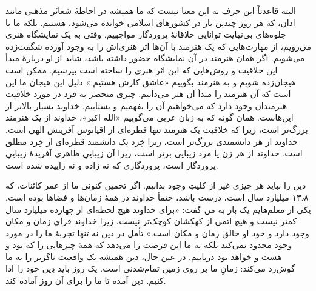 البته قاعدتاً این حرف به این معنا نیست که ما همیشه در احاطهٔ شعائر مذهبی مانند اذان، که هر روز چندین بار در کشورهای اسلامی خوانده می‌شود، هستیم. بلکه ما با جلوه‌های بی‌نهایت توانایی خلاقانهٔ پروردگار مواجهیم. وقتی به یک نمایشگاه هنری می‌رویم،‌ از مهارت‌هایی که یک هنرمند با آن‌ها اثر هنری‌اش را به وجود آورده شگفت‌زده می‌شویم. اگر همان هنرمند در آن نمایشگاه حضور داشته باشد، شاید از او دربارهٔ مبدأ این خلاقیت و روش‌هایی که این اثر هنری را ساخته است بپرسیم. ممکن است هیجان‌زده شویم و به هنرمند بگوییم «عاشق کارش هستیم.»  دلیل این هیجان ما این است که آن هنرمند را مبدأ آن هنر می‌دانیم. چیزی منحصر به فرد در مورد خلاقیت هنرمندان وجود دارد که می‌خواهیم آن را بفهمیم و بستاییم. خداوند بسیار بالاتر از این‌هاست. همان گونه که به زبان عربی می‌گوییم  «الله اکبر»، خداوند از یک هنرمند بزرگ‌تر است، زیرا که خلاقیت یک هنرمند تنها قطره‌ای از اقیانوس آفرینش الهی است. خداوند از هر دانشمندی بزرگ‌تر است، زیرا خِرد یک دانشمند قطره‌ای از خِرد مطلق است. خداوند از هر زن یا مرد زیبایی برتر است، زیرا آن زیباییِ ظاهری آفریدهٔ زیباییِ پروردگار است، پروردگاری که نه زاده و نه زاییده شده است. 

دین را نباید هر چیزی غیر از کلیتِ وجود بدانیم. اگر تخمین کنونی ما از عمر کائنات، که ۱۳٫۸ میلیارد سال است، درست باشد، حتماً خداوند در همهٔ زمان‌ها و فضاها بوده است. یکی از معلم‌هایم یک بار به من گفت: «برای خداوند هیچ لحظه‌ای از چهارده میلیارد سال کمتر نیست و هیچ اتمی از کهکشان کوچک‌تر نیست، زیرا خداوند فرای زمان و مکان وجود دارد و خود او خالق زمان و مکان است.» تأمل در دین نه تنها تجربه‌ٔ ما را در مورد وجود محدود نمی‌کند بلکه به ما این فرصت را می‌دهد که همهٔ‌ چیزهایی را که بود و هست و خواهد بود دریابیم. در عین حال، دین همیشه یک واقعیت ناگزیر را به ما گوش‌زد می‌کند: زمانِ ما بر روی زمین تمام‌شدنی است. یک روز باید دِین خود را ادا کنیم. دین آمده تا ما را برای آن روز آماده کند. 







